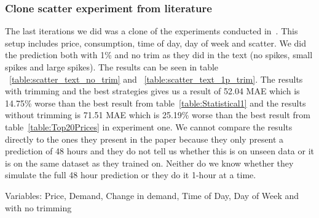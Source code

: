 \subsubsection{Clone scatter experiment from literature}
The last iterations we did was a clone of the experiments conducted in~\cite{singhal2011electricity}. This setup includes price, consumption, time of day, day of week and scatter. We did the prediction both with 1\% and no trim as they did in the text (no spikes, small spikes and large spikes). The results can be seen in table ~\ref{table:scatter_text_no_trim} and ~\ref{table:scatter_text_1p_trim}. The results with trimming and the best strategies gives us a result of 52.04 MAE which is 14.75\% worse than the best result from table~\ref{table:Statistical1} and the results without trimming is 71.51 MAE which is 25.19\% worse than the best result from table~\ref{table:Top20Prices} in experiment one. We cannot compare the results directly to the ones they present in the paper because they only present a prediction of 48 hours and they do not tell us whether this is on unseen data or it is on the same dataset as they trained on. Neither do we know whether they simulate the full 48 hour prediction or they do it 1-hour at a time.

Variables: Price, Demand, Change in demand, Time of Day, Day of Week and with no trimming
\begin{table}[H]
\centering  %
\caption{Scatter text~\cite{singhal2011electricity} with other calculated inputs and no trim} %
\label{table:scatter_text_no_trim} %
\end{table}

